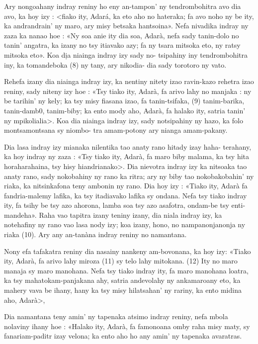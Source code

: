 Ary nongoahany indray reniny ho eny an-tampon' ny tendrombohitra
avo dia avo, ka hoy izy : <fiako ity, Adará, ka eto aho no hateraka; fa avo
noho ny be ity, ka andrandrain' ny maro, ary misy betsaka hantsoina». Nefa
nivadika indray ny zaza ka nanao hoe : «Ny soa anie ity dia soa, Adarà,
nefa sady tanin-dolo no tanin' angatra, ka izany no tsy itiavako azy; fa ny
tsara mitsoka eto, ny ratsy mitsoka eto». Koa dịa niainga indray izy sady no-
tsipahiny iny tendrombohitra iny, ka tomandeboka (8) ny tany, ary nikodia-
dia sady torotoro ny vato.

Rehefa izany dia niainga indray izy, ka nentiny nitety izao ravin-kazo
rehetra izao reniny, sady niteny izy hoe : «Tsy tiako ity, Adarà, fa arivo
lahy no manjaka : ny be tarihin' ny kely; ka tsy misy fiasana izao, fa
tanin-tsifaka, (9) tanim-barika, tanin-damb0, tanim-biby; ka ento mody
aho, Adarà, fa halako ity, satria tanin' ny mpikolialia>. Koa dia niainga
indray izy, sady notsipahiny ny hazo, ka folo montsamontsana sy niombo-
tra amam-potony ary nianga amam-pakany.

Dia lasa indray izy mianaka nilentika tao anaty rano hitady izay haha-
terahany, ka hoy indray ny zaza : «Tsy tiako ity, Adarà, fa maro biby
malama, ka tsy hita horaharahaina, tsy hisy hiandrianako>. Dia nievotra
indray izy ka nitsoaka tao anaty rano, sady nokobahiny ny rano ka ritra; ary
ny biby tao nokobakobahin' ny riaka, ka nitsinkafona teny ambonin ny
rano. Dia hoy izy : «Tiako ity, Adarà fa fandria-malemy lafika, ka tsy
itadiavako lafika sy ondana. Nefa tsy tiako indray ity, fa tsihy be tsy azo
ahorona, lamba soa tsy azo asafotra, ondam-be tsy enti-mandeha». Raha
vao tapitra izany teniny izany, dia niala indray izy, ka notehafiny ny rano
vao lasa nody izy; koa izany, hono, no nampanonjanonja ny riaka (10).
Ary any an-tanàna indray reniny no namantana.

Nony efa tafakatra reniny dia nasainy nankeny am-bovonana, ka hoy
izy: «Tiako ity, Adarà, fa arivo lahy miroza (11) sy telo lahy mitokana. (12)
Ity no maro manaja sy maro manohana. Nefa tsy tiako indray ity, fa maro
manohana loatra, ka tsy mahatokam-panjakana ahy, satria andevolahy ny
ankamaroany eto, ka mahery vava be ihany, hany ka tsy misy hilatsahan' ny
rariny, ka ento midina aho, Adarà>,

Dia namantana teny amin' ny tapenaka atsimo indray reniny, nefa
mbola nolaviny ihany hoe : «Halako ity, Adarà, fa famonoana omby raha
misy maty, sy fanariam-paditr izay velona; ka ento aho ho any amin' ny
tapenaka avaratras.

